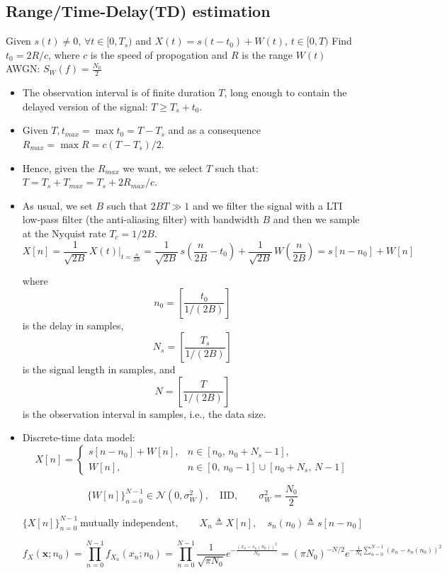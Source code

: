 \subsection{Range/Time-Delay(TD) estimation}
Given \(s(t)\neq0\), \(\forall t\in[0,T_s)\) and \(X(t)=s(t-t_0)+W(t)\), \(t\in[0,T)\)
Find \(t_0=2R/c\), where \(c\) is the speed of propogation and \(R\) is the range \(W(t)\) AWGN: \(S_W(f)=\frac{N_0}{2}\)
\begin{itemize}
    \item The observation interval is of finite duration \(T\), long enough to contain the delayed version of the signal: \(T\geq T_s+t_0\).
    \item Given \(T,t_{max}=\max{t_0}=T-T_s\) and as a consequence \(R_{max}=\max{R}=c(T-T_s)/2\).
    \item Hence, given the \(R_{max}\) we want, we select \(T\) such that: \(T=T_s+T_{max}=T_s+2R_{max}/c\).
    \item As usual, we set \(B\) such that \(2BT\gg1\) and we filter the signal with a LTI low-pass filter (the anti-aliasing filter) with bandwidth \(B\) and then we sample at the Nyquist rate \(T_c=1/2B\).
    \[
X[n] = \frac{1}{\sqrt{2B}}\,X(t)\bigg|_{t = \frac{n}{2B}}
     = \frac{1}{\sqrt{2B}}\,s\!\left(\frac{n}{2B} - t_{0}\right)
       + \frac{1}{\sqrt{2B}}\,W\!\left(\frac{n}{2B}\right)
     = s[n - n_{0}] + W[n]
\]

where
\[
n_{0} = \left[ \frac{t_{0}}{1/(2B)} \right]
\]
is the delay in samples,
\[
N_{s} = \left[ \frac{T_{s}}{1/(2B)} \right]
\]
is the signal length in samples, and
\[
N = \left[ \frac{T}{1/(2B)} \right]
\]
is the observation interval in samples, i.e., the data size.
    \item Discrete-time data model:
\[
X[n] =
\begin{cases}
s[n-n_{0}] + W[n],
  & n \in [n_{0},\, n_{0}+N_{s}-1], \\[4pt]
W[n],
  & n \in [0,\, n_{0}-1] \cup [n_{0}+N_{s},\, N-1]
\end{cases}
\]

\[
\{W[n]\}_{n=0}^{N-1} \in \mathcal{N}\!\left(0,\sigma_{W}^{2}\right),
\quad \text{IID}, \qquad
\sigma_{W}^{2} = \frac{N_{0}}{2}
\]

\[
\{X[n]\}_{n=0}^{N-1} \ \text{mutually independent}, 
\qquad X_n \triangleq X[n], \quad s_n(n_0) \triangleq s[n-n_0]
\]

\[
f_X(\mathbf{x};n_0) = \prod_{n=0}^{N-1} f_{X_n}(x_n;n_0)
   = \prod_{n=0}^{N-1} \frac{1}{\sqrt{\pi N_0}}
   e^{-\frac{(x_n - s_n(n_0))^2}{N_0}}
   = (\pi N_0)^{-N/2} e^{-\frac{1}{N_0}\sum_{n=0}^{N-1}(x_n - s_n(n_0))^2}
\]


\end{itemize}
